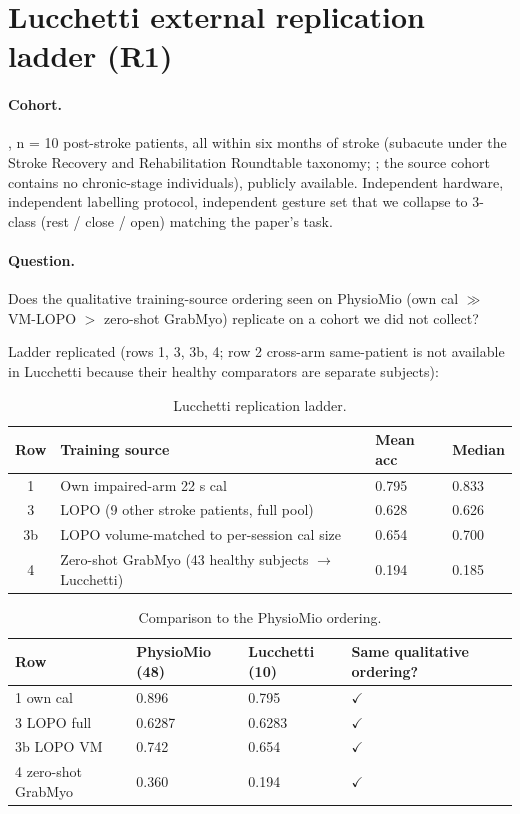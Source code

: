 \documentclass{article}
\begin{document}
\section{Lucchetti external replication ladder (R1)}
\label{app:lucchetti}

\paragraph{Cohort.} \citet{lucchetti2025}, n = 10 post-stroke patients, all within six months of stroke (subacute under the Stroke Recovery and Rehabilitation Roundtable taxonomy; \citealp{bernhardt2017}; the source cohort contains no chronic-stage individuals), publicly available. Independent hardware, independent labelling protocol, independent gesture set that we collapse to 3-class (rest / close / open) matching the paper's task.

\paragraph{Question.} Does the qualitative training-source ordering seen on PhysioMio (own cal $\gg$ VM-LOPO $>$ zero-shot GrabMyo) replicate on a cohort we did not collect?

Ladder replicated (rows 1, 3, 3b, 4; row 2 cross-arm same-patient is not available in Lucchetti because their healthy comparators are separate subjects):

\begin{table}[h]
  \caption{Lucchetti replication ladder.}
  \label{tab:lucchetti}
  \centering
  \small
  \begin{tabular}{clll}
    \toprule
    Row & Training source & Mean acc & Median \\
    \midrule
    1 & Own impaired-arm 22 s cal & 0.795 & 0.833 \\
    3 & LOPO (9 other stroke patients, full pool) & 0.628 & 0.626 \\
    3b & LOPO volume-matched to per-session cal size & 0.654 & 0.700 \\
    4 & Zero-shot GrabMyo (43 healthy subjects $\rightarrow$ Lucchetti) & 0.194 & 0.185 \\
    \bottomrule
  \end{tabular}
\end{table}

\begin{table}[h]
  \caption{Comparison to the PhysioMio ordering.}
  \label{tab:ordering}
  \centering
  \small
  \begin{tabular}{llll}
    \toprule
    Row & PhysioMio (48) & Lucchetti (10) & Same qualitative ordering? \\
    \midrule
    1 own cal & 0.896 & 0.795 & $\checkmark$ \\
    3 LOPO full & 0.6287 & 0.6283 & $\checkmark$ \\
    3b LOPO VM & 0.742 & 0.654 & $\checkmark$ \\
    4 zero-shot GrabMyo & 0.360 & 0.194 & $\checkmark$ \\
    \bottomrule
  \end{tabular}
\end{table}
\end{document}
